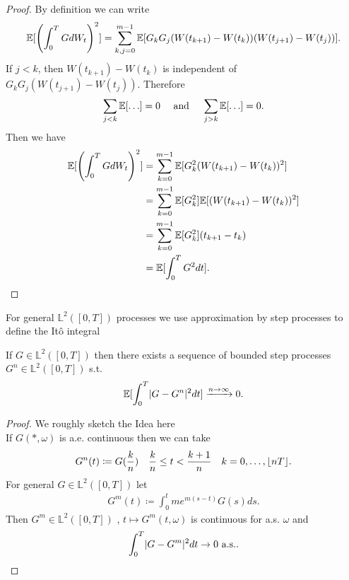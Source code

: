 \begin{proof}
  By definition we can write 
  \begin{align*}
    \mathbb{E}[\left( \int_0^{T} G dW_t  \right)^2 ] = \sum_{k,j=0}^{m-1} \mathbb{E}[G_kG_j(W(t_{k+1})-W(t_k))(W(t_{j+1})-W(t_j))] 
  .\end{align*}
  If $j < k$, then $W(t_{k+1}) -W(t_k)$ is independent of $G_kG_j(W(t_{j+1})-W(t_j))$. Therefore 
  \begin{align*}
    \sum_{j<k}\mathbb{E}[\ldots ] = 0 \quad \text{ and }  \quad \sum_{j>k}\mathbb{E}[\ldots ] = 0
  .\end{align*}
  Then we have 
  \begin{align*}
    \mathbb{E}[\left( \int_0^{T} GdW_t  \right)^2 ] &= \sum_{k=0}^{m-1} \mathbb{E}[G_k^2(W(t_{k+1})-W(t_k))^2]  \\
                                            &= \sum_{k=0}^{m-1} \mathbb{E}[G_k^2]\mathbb{E}[(W(t_{k+1})-W(t_k))^2] \\
                                            &= \sum_{k=0}^{m-1} \mathbb{E}[G_k^2](t_{k+1}-t_k) \\
                                            &= \mathbb{E}[\int_0^{T} G^2dt ] 
  .\end{align*}
\end{proof}
For general $\mathbb{L}^2([0,T])$ processes we use approximation by step processes to define the It\^o integral 
\begin{lemma}
  If $G \in  \mathbb{L}^2([0,T])$  then there exists a sequence of bounded step processes  $G^{n} \in  \mathbb{L}^2([0,T])$  s.t. 
  \begin{align*}
   \mathbb{E}[\int_0^{T} \lvert G - G^{n} \rvert^2 dt ] \xrightarrow{n\to \infty} 0
  .\end{align*}
\end{lemma}
\begin{proof}
  We roughly sketch the Idea here \\[1ex]
  If $G(*,\omega )$  is a.e. continuous then we can take  
 \begin{align*}
   G^{n}(t) \coloneqq  G(\frac{k}{n})  \quad \frac{k}{n} \le t < \frac{k+1}{n} \quad k=0,\ldots ,\lfloor nT\rfloor
 .\end{align*}
 For general $G \in  \mathbb{L}^2([0,T])$ let 
 \begin{align*}
  G^{m}(t) \coloneqq  \int_0^{t} m e^{m(s-t)}G(s) ds   
 .\end{align*}
 Then $G^{m} \in  \mathbb{L}^2([0,T]) $ , $t \mapsto G^{m}(t,\omega ) $ is continuous for a.s. $\omega $ and 
 \begin{align*}
  \int_0^{T} \lvert G - G^{m} \rvert^2 dt \to 0 \text{ a.s.}
 .\end{align*}
\end{proof}
